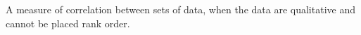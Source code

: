 A measure of correlation between sets of data, when the data are
qualitative and cannot be placed rank order.